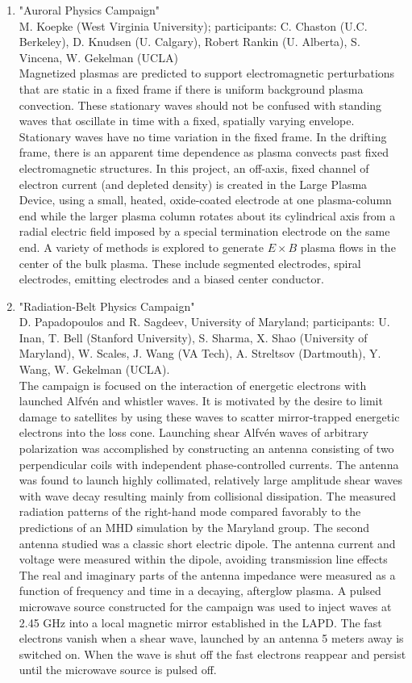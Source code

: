 \documentclass[11pt]{article}
\begin{document}
\begin{enumerate}
\item "Auroral Physics Campaign" \\ M. Koepke (West Virginia
  University); participants: C. Chaston (U.C. Berkeley), D. Knudsen
  (U. Calgary), Robert Rankin (U. Alberta), S. Vincena, W. Gekelman
  (UCLA) \\ Magnetized plasmas are
  predicted to support electromagnetic perturbations that are static
  in a fixed frame if there is uniform background plasma
  convection. These stationary waves should not be confused with
  standing waves that oscillate in time with a fixed, spatially
  varying envelope. Stationary waves have no time variation in the
  fixed frame. In the drifting frame, there is an apparent time
  dependence as plasma convects past fixed electromagnetic
  structures. In this project, an off-axis, fixed channel of electron
  current (and depleted density) is created in the Large Plasma
  Device, using a small, heated, oxide-coated electrode at one
  plasma-column end while the larger plasma column rotates about its
  cylindrical axis from a radial electric field imposed by a special
  termination electrode on the same end. A variety of methods is
  explored to generate $E\times B$ plasma flows in the center of the bulk
  plasma. These include segmented electrodes, spiral electrodes,
  emitting electrodes and a biased center conductor.
 
 
\item "Radiation-Belt Physics Campaign"\\ D. Papadopoulos and
  R. Sagdeev, University of Maryland; participants: U. Inan, T. Bell
  (Stanford University), S. Sharma, X. Shao (University of Maryland),
  W. Scales, J. Wang (VA Tech), A. Streltsov (Dartmouth), Y. Wang,
  W. Gekelman (UCLA).\\ The
  campaign is focused on the interaction of energetic electrons with
  launched Alfv\'{e}n and whistler waves. It is motivated by the
  desire to limit damage to satellites by using these waves to scatter
  mirror-trapped energetic electrons into the loss cone. Launching
  shear Alfv\'{e}n waves of arbitrary polarization was accomplished by
  constructing an antenna consisting of two perpendicular coils with
  independent phase-controlled currents. The antenna was found to
  launch highly collimated, relatively large amplitude shear waves
  with wave decay resulting mainly from collisional dissipation. The
  measured radiation patterns of the right-hand mode compared
  favorably to the predictions of an MHD simulation by the Maryland
  group. The second antenna studied was a classic short electric
  dipole. The antenna current and voltage were measured within the
  dipole, avoiding transmission line effects The real and imaginary
  parts of the antenna impedance were measured as a function of
  frequency and time in a decaying, afterglow plasma. A pulsed
  microwave source constructed for the campaign was used to inject
  waves at 2.45 GHz into a local magnetic mirror established in the
  LAPD. The fast electrons vanish when a shear wave, launched by an
  antenna 5 meters away is switched on. When the wave is shut off the
  fast electrons reappear and persist until the microwave source is
  pulsed off.



\end{enumerate}
\end{document}

